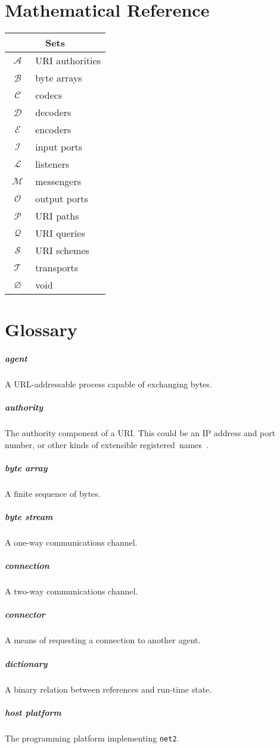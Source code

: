 \documentclass[letterpaper,12pt,openany]{report}
\newcommand{\NetTwo}{\texttt{net2}}
\DeclareMathOperator{\As}{\ensuremath{\mathcal{A}}}
\DeclareMathOperator{\Bs}{\ensuremath{\mathcal{B}}}
\DeclareMathOperator{\Cs}{\ensuremath{\mathcal{C}}}
\DeclareMathOperator{\Ds}{\ensuremath{\mathcal{D}}}
\DeclareMathOperator{\Es}{\ensuremath{\mathcal{E}}}
\DeclareMathOperator{\Is}{\ensuremath{\mathcal{I}}}
\DeclareMathOperator{\Ls}{\ensuremath{\mathcal{L}}}
\DeclareMathOperator{\Ms}{\ensuremath{\mathcal{M}}}
\DeclareMathOperator{\Os}{\ensuremath{\mathcal{O}}}
\DeclareMathOperator{\Ps}{\ensuremath{\mathcal{P}}}
\DeclareMathOperator{\Qs}{\ensuremath{\mathcal{Q}}}
\DeclareMathOperator{\Ss}{\ensuremath{\mathcal{S}}}
\DeclareMathOperator{\Ts}{\ensuremath{\mathcal{T}}}
\DeclareMathOperator{\Void}{\ensuremath{\varnothing}}
\newcommand{\GlossaryItem}[2]{
  \paragraph{#1} #2\vspace{-1ex}
}
\begin{document}
\appendix

\chapter{Mathematical Reference}

\begin{tabular}{|c|l|}
  \hline
  \multicolumn{2}{|c|}{Sets} \\
  \hline
  $\As$ & URI authorities \\
  $\Bs$ & byte arrays \\
  $\Cs$ & codecs \\
  $\Ds$ & decoders \\
  $\Es$ & encoders \\
  $\Is$ & input ports \\
  $\Ls$ & listeners \\
  $\Ms$ & messengers \\
  $\Os$ & output ports \\
  $\Ps$ & URI paths \\
  $\Qs$ & URI queries \\
  $\Ss$ & URI schemes \\
  $\Ts$ & transports \\
  $\Void$ & void \\
  \hline
\end{tabular}

\chapter{Glossary}
\label{cha:glossary}

\GlossaryItem{agent}{A URL-addressable process capable of exchanging bytes.}

\GlossaryItem{authority}{The authority component of a URI. This could be an IP
  address and port number, or other kinds of extensible
  registered~names~\cite{berners2014rfc}.}

\GlossaryItem{byte array}{A finite sequence of bytes.}

\GlossaryItem{byte stream}{A one-way communications channel.}

\GlossaryItem{connection}{A two-way communications channel.}

\GlossaryItem{connector}{A means of requesting a connection to another agent.}

\GlossaryItem{dictionary}{A binary relation between references and run-time
  state.}

\GlossaryItem{host platform}{The programming platform implementing {\NetTwo}.}
\end{document}
